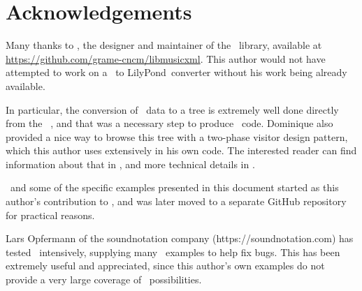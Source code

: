 



\chapter{Acknowledgements}



Many thanks to \fober, the designer and maintainer of the \libmusicxml\ library, available at \url{https://github.com/grame-cncm/libmusicxml}. This author would not have attempted to work on a \mxml\ to LilyPond\ converter without his work being already available.

In particular, the conversion of \mxml\ data to a tree is extremely well done directly from the \mxml\ \dtd, and that was a necessary step to produce \lily\ code. Dominique also provided a nice way to browse this tree with a two-phase visitor design pattern, which this author uses extensively in his own code. The interested reader can find information about that in , and more technical details in .

\xmlToLy\ and some of the specific examples presented in this document started as this author's contribution to \libmusicxml, and was later moved to a separate GitHub repository for practical reasons.

Lars Opfermann of the soundnotation company (https://soundnotation.com) has tested \xmlToLy\ intensively, supplying many \mxml\ examples to help fix bugs. 
This has been extremely useful and appreciated, since this author's own examples do not provide a very large coverage of \mxml\ possibilities.